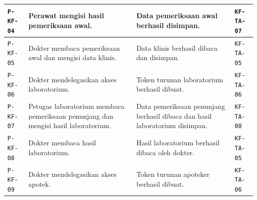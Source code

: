 \documentclass[bahasa, 12pt, a4paper, onecolumn, oneside, final]{report}
\begin{document}
\begin{longtable}{|p{}|p{}|p{}|p{}|}
	\texttt{P-KF-04}                                                                   &
	Perawat mengisi hasil pemeriksaan awal.                                            &
	Data pemeriksaan awal berhasil disimpan.                                           &
	\texttt{KF-TA-07}                                                                                                                          \\ \hline

	\texttt{P-KF-05}                                                                   &
	Dokter membaca pemeriksaan awal dan mengisi data klinis.                           &
	Data klinis berhasil dibaca dan disimpan.                                          &
	\texttt{KF-TA-05}                                                                                                                          \\ \hline

	\texttt{P-KF-06}                                                                   &
	Dokter mendelegasikan akses laboratorium.                                          &
	Token turunan laboratorium berhasil dibuat.                                        &
	\texttt{KF-TA-06}                                                                                                                          \\ \hline

	\texttt{P-KF-07}                                                                   &
	Petugas laboratorium membaca pemeriksaan penunjang dan mengisi hasil laboratorium. &
	Data pemeriksaan penunjang berhasil dibaca dan hasil laboratorium disimpan.        &
	\texttt{KF-TA-08}                                                                                                                          \\ \hline

	\texttt{P-KF-08}                                                                   &
	Dokter membaca hasil laboratorium.                                                 &
	Hasil laboratorium berhasil dibaca oleh dokter.                                    &
	\texttt{KF-TA-05}                                                                                                                          \\ \hline

	\texttt{P-KF-09}                                                                   &
	Dokter mendelegasikan akses apotek.                                                &
	Token turunan apoteker berhasil dibuat.                                            &
	\texttt{KF-TA-06}                                                                                                                          \\ \hline


\end{longtable}
\end{document}

